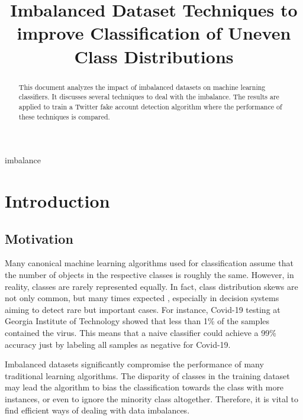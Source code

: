 \documentclass[conference]{IEEEtran}
\begin{document}
\title{Imbalanced Dataset Techniques to improve Classification of Uneven Class Distributions\\
}

\author{
\and
{}
\and
{}
}

\maketitle

\begin{abstract}
This document analyzes the impact of imbalanced datasets on machine learning classifiers. It discusses several techniques to deal with the imbalance. The results are applied to train a Twitter fake account detection algorithm where the performance of these techniques is compared. 
\end{abstract}

\begin{IEEEkeywords}
imbalance
\end{IEEEkeywords}

\section{Introduction}
	\subsection{Motivation}
	Many canonical machine learning algorithms used for classification assume that the number of objects in the respective classes is roughly the same. However, in reality, classes are rarely represented equally. In fact, class distribution skews are not only common, but many times expected \cite{data_imbalance_overview}, especially in decision systems aiming to detect rare but important cases. For instance, Covid-19 testing at Georgia Institute of Technology showed that less than 1\% of the samples contained the virus. This means that a naive classifier could achieve a 99\% accuracy just by labeling all samples as negative for Covid-19.
	
Imbalanced datasets significantly compromise the performance of many traditional learning algorithms. The disparity of classes in the training dataset may lead the algorithm to bias the classification towards the class with more instances, or even to ignore the minority class altogether. Therefore, it is vital to find efficient ways of dealing with data imbalances.
\end{document}
